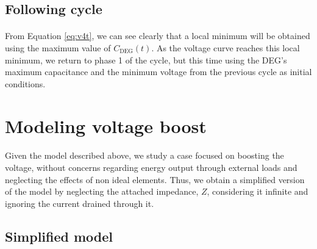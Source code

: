 \subsection{Following cycle}

\paragraph{} From Equation \ref{eq:v4t}, we can see clearly that a local minimum will be obtained using the maximum value of $C_\text{DEG}(t)$.	As the voltage curve reaches this local minimum, we return to phase 1 of the cycle, but this time using the DEG's maximum capacitance and the minimum voltage from the previous cycle as initial conditions.

\section{Modeling voltage boost}

\paragraph{} Given the model described above, we study a case focused on boosting the voltage, without concerns regarding energy output through external loads and neglecting the effects of non ideal elements. Thus, we obtain a simplified version of the model by  neglecting  the attached impedance, $Z$, considering it infinite and ignoring the current drained through it.

\subsection{Simplified model}\label{sec:noload}

